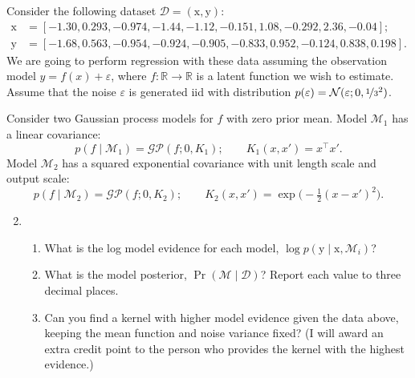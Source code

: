 \documentclass{article}
\newcommand{\given}{\mid}
\newcommand{\mc}[1]{\mathcal{#1}}
\newcommand{\data}{\mc{D}}
\newcommand{\model}{\mc{M}}
\newcommand{\R}{\mathbb{R}}
\newcommand{\trans}{^\top}
\renewcommand{\vec}[1]{\bm{\mathrm{#1}}}
\begin{document}
\clearpage

Consider the following dataset $\data = (\vec{x}, \vec{y})$:
\begin{align*}
  \vec{x} &= [-1.30, 0.293, -0.974, -1.44, -1.12, -0.151, 1.08, -0.292, 2.36, -0.04]; \\
  \vec{y} &= [-1.68, 0.563, -0.954, -0.924, -0.905, -0.833, 0.952, -0.124, 0.838, 0.198].
\end{align*}
We are going to perform regression with these data assuming the observation
model $y = f(x) + \varepsilon$, where $f\colon \R \to \R$ is a latent function
we wish to estimate. Assume that the noise $\varepsilon$ is generated iid with
distribution $p(\varepsilon) = \mc{N}(\varepsilon; 0, \nicefrac{1}{3}^2)$.

Consider two Gaussian process models for $f$ with zero prior mean.  Model
$\model_1$ has a linear covariance:
\[
  p(f \given \model_1) = \mc{GP}(f; 0, K_1);
  \qquad
  K_1(x, x') = x\trans x'.
\]
Model $\model_2$ has a squared exponential covariance with unit length scale and
output scale:
\[
  p(f \given \model_2) = \mc{GP}(f; 0, K_2);
  \qquad
  K_2(x, x') = \exp\bigl(-\tfrac{1}{2}(x - x')^2\bigr).
\]

\begin{enumerate}\setcounter{enumi}{1}
\item
  \begin{enumerate}
  \item What is the log model evidence for each model, $\log p(\vec{y} \given \vec{x}, \model_i)$?
  \item What is the model posterior, $\Pr(\model \given \data)$? Report each
    value to three decimal places.
  \item
    Can you find a kernel with higher model evidence given the data above,
    keeping the mean function and noise variance fixed?  (I will award an extra
    credit point to the person who provides the kernel with the highest
    evidence.)
  \end{enumerate}
\end{enumerate}
\end{document}
